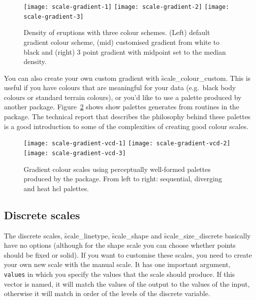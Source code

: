 \begin{figure}[htbp]
  \centering
    \texttt{[image: scale-gradient-1]}%
    \texttt{[image: scale-gradient-2]}%
    \texttt{[image: scale-gradient-3]}
  \caption{Density of eruptions with three colour schemes.  (Left) default gradient colour scheme, (mid) customised gradient from white to black and (right) 3 point gradient with midpoint set to the median density.}
  \label{fig:gradient}
\end{figure}


You can also create your own custom gradient with \f{scale_colour_custom}.  This is useful if you have colours that are meaningful for your data (e.g.\ black body colours or standard terrain colours), or you'd like to use a palette produced by another package.  Figure~\ref{fig:vcd} shows show palettes generates from routines in the  package.  The technical report \citet{zeileis:2007} that describes the philosophy behind these palettes is a good introduction to some of the complexities of creating good colour scales.


\begin{figure}[htbp]
  \centering
    \texttt{[image: scale-gradient-vcd-1]}%
    \texttt{[image: scale-gradient-vcd-2]}%
    \texttt{[image: scale-gradient-vcd-3]}
  \caption{Gradient colour scales using perceptually well-formed palettes produced by the  package.  From left to right: sequential, diverging and heat hcl palettes.}
  \label{fig:vcd}
\end{figure}

\subsection{Discrete scales}
\label{sub:scale-discrete}

The discrete scales, \f{scale_linetype}, \f{scale_shape} and \f{scale_size_discrete} basically have no options (although for the shape scale you can choose whether points should be fixed or solid).  If you want to customise these scales, you need to create your own new scale with the manual scale.  It has one important argument, \verb|values| in which you specify the values that the scale should produce.  If this vector is named, it will match the values of the output to the values of the input, otherwise it will match in order of the levels of the discrete variable.  

